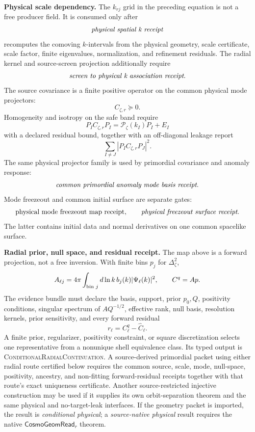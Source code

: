 \textbf{Physical scale dependency.}
The \(k_{rj}\) grid in the preceding equation is not a free producer field.  It is consumed only
after
\[
\emph{physical spatial k receipt}
\]
recomputes the comoving \(k\)-intervals from the physical geometry, scale certificate, scale factor,
finite eigenvalues, normalization, and refinement residuals.  The radial kernel and source-screen
projection additionally require
\[
\emph{screen to physical k association receipt}.
\]
The source covariance is a finite positive operator on the common physical mode projectors:
\[
C_{\zeta,r}\succeq0.
\]
Homogeneity and isotropy on the safe band require
\[
P_I C_{\zeta,r}P_I=\mathcal P_\zeta(k_I)P_I+E_I
\]
with a declared residual bound, together with an off-diagonal leakage report
\[
\sum_{I\ne J}|P_I C_{\zeta,r}P_J|^2.
\]
The same physical projector family is used by primordial covariance and anomaly response:
\[
\emph{common primordial anomaly mode basis receipt}.
\]
Mode freezeout and common initial surface are separate gates:
\[
\text{physical mode freezeout map receipt},\qquad
\emph{physical freezeout surface receipt}.
\]
The latter contains initial data and normal derivatives on one common spacelike surface.

\textbf{Radial prior, null space, and residual receipt.}
The map above is a forward projection, not a free inversion.  With finite
bins \(p_j\) for \(\Delta_\zeta^2\),
\[
A_{\ell j}=4\pi\int_{\hbox{\scriptsize bin }j}d\ln k\,
b_j(k)|\Psi_\ell(k)|^2,
\qquad
C^q=Ap .
\]
The evidence bundle must declare the basis, support, prior \(p_0,Q\), positivity
conditions, singular spectrum of \(AQ^{-1/2}\), effective rank, null basis,
resolution kernels, prior sensitivity, and every forward residual
\[
r_\ell=C_\ell^q-\widehat C_\ell .
\]
A finite prior, regularizer, positivity constraint, or square discretization
selects one representative from a nonunique shell equivalence class. Its typed
output is \textsc{ConditionalRadialContinuation}. A source-derived primordial
packet using either radial route certified below requires the common source,
scale, mode, null-space, positivity, ancestry, and non-fitting forward-residual
receipts together with that route's exact uniqueness certificate. Another
source-restricted injective construction may be used if it supplies its own
orbit-separation theorem and the same physical and no-target-leak interfaces.
If the geometry packet
is imported, the result is
\emph{conditional physical}; a \emph{source-native physical} result requires the
native \(\mathsf{CosmoGeomRead}_r\) theorem.

